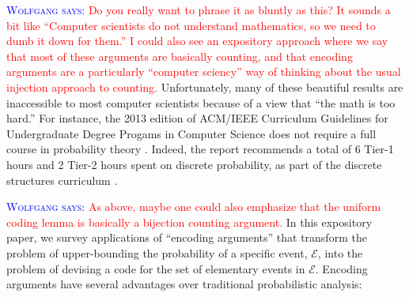 \documentclass{patmorin}
\newcommand{\aremark}[3]{\textcolor{blue}{\textsc{#1 #2:}}
  \textcolor{red}{\textsf{#3}}}
\newcommand{\wolfgang}[2][says]{\aremark{Wolfgang}{#1}{#2}}
\begin{document}
\wolfgang{Do you really want to phrase it as bluntly as this?
It sounds a bit like ``Computer scientists do not understand
mathematics, so we need to dumb it down for them.''
I could also see an expository approach where we say that
most of these arguments are basically counting, and that
encoding arguments are a particularly ``computer sciency''
way of thinking about the usual injection approach to counting.}
Unfortunately, many of these beautiful results are inaccessible to
most computer scientists because of a view that ``the math is too
hard.''  For instance, the 2013 edition of ACM/IEEE Curriculum
Guidelines for Undergraduate Degree Progams in Computer Science does
not require a full course in probability theory
\cite[Page~50]{computing-curricula:computer}. Indeed, the report
recommends a total of 6 Tier-1 hours and 2 Tier-2 hours spent on
discrete probability, as part of the discrete structures curriculum
\cite[Page~77]{computing-curricula:computer}.

\wolfgang{As above, maybe one could also emphasize that
the uniform coding lemma is basically a bijection counting argument.}
In this expository paper, we survey applications of ``encoding
arguments'' that transform the problem of upper-bounding the
probability of a specific event, $\mathcal{E}$, into the problem of
devising a code for the set of elementary events in $\mathcal{E}$.
Encoding arguments have several advantages over traditional
probabilistic analysis:
\end{document}
